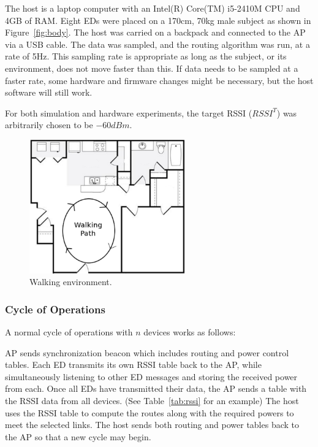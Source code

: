 \documentclass{article}
\begin{document}
The host is a laptop computer with an Intel(R) Core(TM) i5-2410M CPU and 4GB of RAM. Eight EDs were placed on a 170cm, 70kg male subject as shown in Figure~\ref{fig:body}. The host was carried on a backpack and connected to the AP via a USB cable. The data was sampled, and the routing algorithm was run, at a rate of 5Hz. This sampling rate is appropriate as long as the subject, or its environment, does not move faster than this. If data needs to be sampled at a faster rate, some hardware and firmware changes might be necessary, but the host software will still work.

For both simulation and hardware experiments, the target RSSI ($RSSI^T$) was arbitrarily chosen to be $-60 dBm$.

\begin{figure}[!htb]
\begin{center}
\includegraphics[width=0.6\textwidth]{figures/floorplan.pdf}
\end{center}
\caption{Walking environment.}
\label{fig:floorplan}
\end{figure}

\subsubsection{Cycle of Operations}\label{subsec:cycleofoperations}
A normal cycle of operations with $n$ devices works as follows:

\begin{algorithmic}[1]
\STATE AP sends synchronization beacon which includes routing and power control tables.
\STATE Each ED transmits its own RSSI table back to the AP, while simultaneously listening to other ED messages and storing the received power from each.
\STATE Once all EDs have transmitted their data, the AP sends a table with the RSSI data from all devices. (See Table~\ref{tab:rssi} for an example)
\STATE The host uses the RSSI table to compute the routes along with the required powers to meet the selected links.
\STATE The host sends both routing and power tables back to the AP so that a new cycle may begin.
\end{algorithmic}
\end{document}
